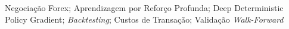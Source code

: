 \acresetall
\begin{otherlanguage}{portuguese}
\noindent Negociação Forex; Aprendizagem por Reforço Profunda; Deep Deterministic Policy Gradient; \textit{Backtesting}; Custos de Transação; Validação \textit{Walk-Forward}
\end{otherlanguage}